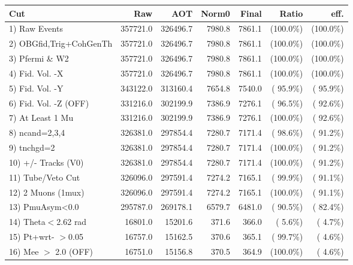  \begin{table}[h!]\centering
 \begin{tabular}{||l||r|r|r|r|r|r||}
 \hline
 \hline
 Cut & Raw & AOT & Norm0 & Final & Ratio & eff.       \\
 \hline
  1) Raw Events           &     357721.0 &     326496.7 &       7980.8 &       7861.1 & (100.0\%) & (100.0\%) \\
  2) OBGfid,Trig+CohGenTh &     357721.0 &     326496.7 &       7980.8 &       7861.1 & (100.0\%) & (100.0\%) \\
  3) Pfermi \& W2         &     357721.0 &     326496.7 &       7980.8 &       7861.1 & (100.0\%) & (100.0\%) \\
  4) Fid. Vol. -X         &     357721.0 &     326496.7 &       7980.8 &       7861.1 & (100.0\%) & (100.0\%) \\
  5) Fid. Vol. -Y         &     343122.0 &     313160.4 &       7654.8 &       7540.0 & ( 95.9\%) & ( 95.9\%) \\
  6) Fid. Vol. -Z (OFF)   &     331216.0 &     302199.9 &       7386.9 &       7276.1 & ( 96.5\%) & ( 92.6\%) \\
  7) At Least 1 Mu        &     331216.0 &     302199.9 &       7386.9 &       7276.1 & (100.0\%) & ( 92.6\%) \\
  8) ncand=2,3,4          &     326381.0 &     297854.4 &       7280.7 &       7171.4 & ( 98.6\%) & ( 91.2\%) \\
  9) tnchgd=2             &     326381.0 &     297854.4 &       7280.7 &       7171.4 & (100.0\%) & ( 91.2\%) \\
 10) +/- Tracks (V0)      &     326381.0 &     297854.4 &       7280.7 &       7171.4 & (100.0\%) & ( 91.2\%) \\
 11) Tube/Veto Cut        &     326096.0 &     297591.4 &       7274.2 &       7165.1 & ( 99.9\%) & ( 91.1\%) \\
 12) 2 Muons (1mux)       &     326096.0 &     297591.4 &       7274.2 &       7165.1 & (100.0\%) & ( 91.1\%) \\
 13) PmuAsym<0.0          &     295787.0 &     269178.1 &       6579.7 &       6481.0 & ( 90.5\%) & ( 82.4\%) \\
 14) Theta$<$2.62 rad     &      16801.0 &      15201.6 &        371.6 &        366.0 & (  5.6\%) & (  4.7\%) \\
 15) Pt+wrt- $>$0.05      &      16757.0 &      15162.5 &        370.6 &        365.1 & ( 99.7\%) & (  4.6\%) \\
 16) Mee $>$ 2.0  (OFF)   &      16751.0 &      15156.8 &        370.5 &        364.9 & (100.0\%) & (  4.6\%) \\

\end{tabular}
\end{table}
